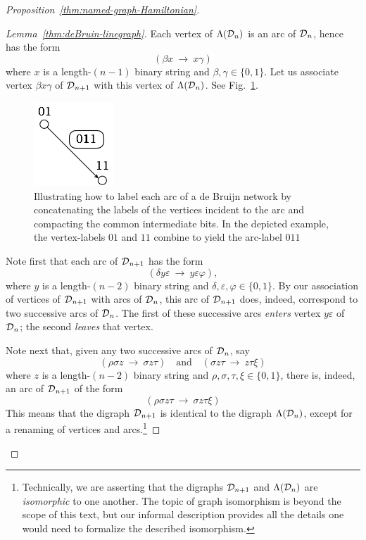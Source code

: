 \begin{proof}[Proposition~\ref{thm:named-graph-Hamiltonian}]
\begin{proof}[Lemma~\ref{thm:deBruin-linegraph}]
Each vertex of $\Lambda(\mbox{$\cal D$}_n)$ is an arc of $\mbox{$\cal D$}_n$, hence has the form
\[ (\beta x \ \rightarrow \ x \gamma) \]
where $x$ is a length-$(n-1)$ binary string and $\beta, \gamma \in \{0,1\}$.  Let us associate vertex $\beta x \gamma$ of $\mbox{$\cal D$}_{n+1}$ with this vertex of $\Lambda(\mbox{$\cal D$}_n)$.  See Fig.~\ref{fig:dBlabelEdge-App}.
\begin{figure}[hbt]
\begin{center}
       \includegraphics[scale=0.45]{FiguresGraph/dBlabelEdge}
\caption{Illustrating how to label each arc of a de Bruijn network by concatenating the labels of the vertices incident to the arc and compacting the common intermediate bits.  In the depicted example, the vertex-labels $01$ and $11$ combine to yield the arc-label $011$}
  \label{fig:dBlabelEdge-App}
\end{center}
\end{figure}

\smallskip

Note first that each arc of $\mbox{$\cal D$}_{n+1}$ has the form
\[ (\delta y \varepsilon \ \rightarrow \ y \varepsilon \varphi), \]
where $y$ is a length-$(n-2)$ binary string and $\delta, \varepsilon, \varphi \in \{0,1\}$.  By our association of vertices of $\mbox{$\cal D$}_{n+1}$ with arcs of $\mbox{$\cal D$}_n$, this arc of $\mbox{$\cal D$}_{n+1}$ does, indeed, correspond to two successive arcs of $\mbox{$\cal D$}_n$.   The first of these successive arcs {\em enters} vertex $y \varepsilon$ of $\mbox{$\cal D$}_n$; the second {\em leaves} that vertex.

\smallskip

Note next that, given any two successive arcs of $\mbox{$\cal D$}_n$, say
\[
(\rho \sigma z \ \rightarrow \ \sigma z \tau) \ \ \ \mbox { and } \ \ \
(\sigma z \tau \ \rightarrow \  z \tau \xi)
\]
where $z$ is a length-$(n-2)$ binary string and $\rho, \sigma, \tau, \xi \in \{0,1\}$, there is, indeed, an arc of $\mbox{$\cal D$}_{n+1}$ of the form
\[ (\rho \sigma z \tau \ \rightarrow \ \sigma z \tau \xi) \]
This means that the digraph $\mbox{$\cal D$}_{n+1}$ is identical to the digraph $\Lambda(\mbox{$\cal D$}_n)$, except for a renaming of vertices and arcs.\footnote{Technically, we are asserting that the digraphs ${\cal D}_{n+1}$ and ${\Lambda}({\cal D}_n)$ are {\it isomorphic} to one another.  The topic of graph isomorphism is beyond the scope of this text, but our informal description provides all the details one would need to formalize the described isomorphism.}


\end{proof}
\end{proof}
